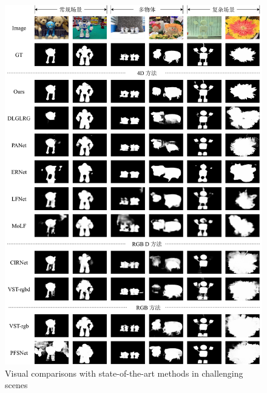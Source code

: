 \begin{figure}[b]
	\centering
	\includegraphics[width=\linewidth]{figures/chapter3/compare_with_sota}
	{Visual comparisons with state-of-the-art methods in challenging scenes}
	\label{figure:figure_comparison_1}
\end{figure}



%
%
%



